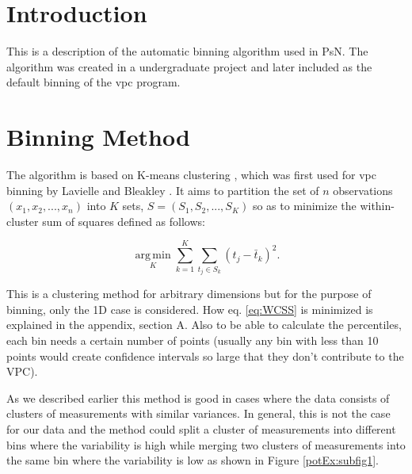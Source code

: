 

\usepackage{algorithm}
\usepackage{algorithmic}
\usepackage{graphicx}
\usepackage{epstopdf}
\usepackage{subfigure}
\usepackage[utf8]{inputenc}
\usepackage{amssymb,amsmath} 
\usepackage{color}
\usepackage{soul}
\usepackage[normalem]{ulem}
\newcommand{\hilight}[1]{\colorbox{yellow}{#1}}




\maketitle

\section{Introduction}
This is a description of the automatic binning algorithm used in PsN. The algorithm was created in a undergraduate project \cite{Sonehag} and later included as the default binning of the vpc program.

\section{Binning Method}
The algorithm is based on K-means clustering \cite{KMeans}, which was first used for vpc binning by Lavielle and Bleakley \cite{Lavielle}.
It aims to partition the set of $n$ observations $(x_1, x_2, ..., x_n)$ into $K$ sets, $S=(S_1, S_2, ..., S_K)$ so as to minimize the within-cluster sum of squares defined as follows: 

\begin{equation}
	  \underset{K}{\operatorname{arg\,min}} \sum_{k=1}^{K} \sum_{t_j \in S_k} (t_j - \bar{t}_k )^2.
	  \label{eq:WCSS} 
\end{equation}

This is a clustering method for arbitrary dimensions but for the purpose of binning, only the 1D case is considered. How eq. \ref{eq:WCSS} is minimized is explained in the appendix, section A. Also to be able to calculate the percentiles, each bin needs a certain number of points (usually any bin with less than 10 points would create confidence intervals so large that they don't contribute to the VPC).

As we described earlier this method is good in cases where the data consists of clusters of measurements with similar variances. In general, this is not the case for our data and the method could split a cluster of measurements into different bins where the variability is high while merging two clusters of measurements into the same bin where the variability is low as shown in Figure \ref{potEx:subfig1}.
\par


